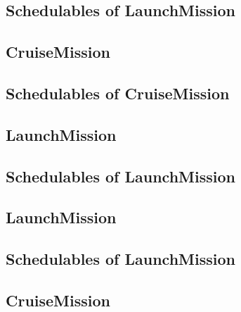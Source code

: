 \documentclass[10pt,a4paper]{article}
\begin{document}
\subsection{Schedulables of LaunchMission}


\newpage


\subsection{CruiseMission}

\newpage

\subsection{Schedulables of CruiseMission}


\newpage


\newpage


\newpage


\subsection{LaunchMission}

\newpage

\subsection{Schedulables of LaunchMission}


\newpage


\subsection{LaunchMission}

\newpage

\subsection{Schedulables of LaunchMission}


\newpage


\subsection{CruiseMission}

\newpage
\end{document}
